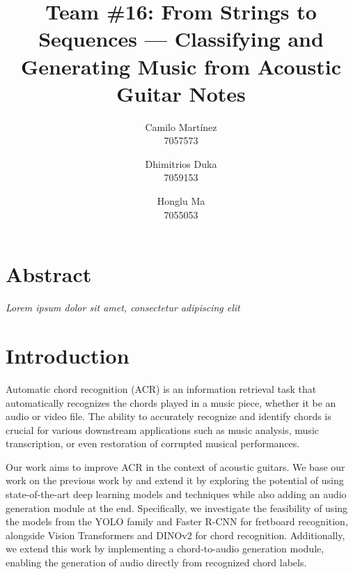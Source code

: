 \documentclass[10pt,twocolumn,letterpaper]{article}
\begin{document}
\newcommand{\dhimitrios}[1]{\textcolor{red}{Dhimitrios: #1}}

\title{Team \#16: From Strings to Sequences --- Classifying and Generating Music from Acoustic Guitar Notes}


\author{
  Camilo Martínez\\
  7057573\\
  \and
  Dhimitrios Duka\\
  7059153\\
  \and
  Honglu Ma\\
  7055053\\
}
\maketitle

\section{Abstract}
\emph{Lorem ipsum dolor sit amet, consectetur adipiscing elit}

\section{Introduction}
Automatic chord recognition (ACR) is an information retrieval task that automatically recognizes the chords played in a music piece, whether it be an audio or video file. The ability to accurately recognize and identify chords is crucial for various downstream applications such as music analysis, music transcription, or even restoration of corrupted musical performances. 

Our work aims to improve ACR in the context of acoustic guitars. We base our work on the previous work by \cite{Kristian_Zaman_Tenoyo_Jodhinata_2024} and extend it by exploring the potential of using state-of-the-art deep learning models and techniques while also adding an audio generation module at the end. Specifically, we investigate the feasibility of using the models from the YOLO \cite{redmon2016you} family and Faster R-CNN \cite{ren2016faster} for fretboard recognition, alongside Vision Transformers \cite{dosovitskiy2020image} and DINOv2 \cite{oquab2023dinov2} for chord recognition. Additionally, we extend this work by implementing a chord-to-audio generation module, enabling the generation of audio directly from recognized chord labels.
\end{document}
